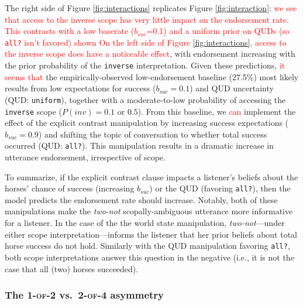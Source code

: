 \documentclass[preprint,authoryear]{elsarticle}\frenchspacing
\newcommand{\lp}[1]{\textcolor{red}{#1}} %
\begin{document}
The right side of Figure 
\ref{fig:interactions} replicates Figure \ref{fig:interaction}: 
\lp{we see that access to the inverse scope has very little impact on the endorsement rate.}
\lp{This contrasts with a low baserate ($b_{suc}$=0.1) and a uniform prior on QUDs (so \texttt{all?} isn't favored) shown 
On the left side of Figure \ref{fig:interactions}, %
access to the inverse scope does have a noticeable effect}, with endorsement increasing with the prior probability of the \texttt{inverse} interpretation. 
Given these predictions, \lp{it seems that} the empirically-observed low-endorsement baseline (27.5\%) most likely results from low expectations for success ($b_{suc}=0.1$) and QUD uncertainty (QUD: \texttt{uniform}), together with a moderate-to-low probability of accessing the \texttt{inverse} scope ($P(inv)=0.1$ or $0.5$). From this baseline, we \lp{can} implement the effect of the explicit contrast manipulation by increasing success expectations ($b_{suc}=0.9$) and shifting the topic of conversation to whether total success occurred (QUD: \texttt{all?}). This manipulation results in a dramatic increase in utterance endorsement, irrespective of scope. 

To summarize, if the explicit contrast clause impacts a listener's beliefs about the horses' chance of success (increasing $b_{suc}$) or the QUD (favoring \texttt{all?}), then the model predicts the endorsement rate should increase. Notably, both of these manipulations make the \emph{two-not} scopally-ambiguous utterance more informative for a listener. In the case of the the world state manipulation, \emph{two-not}---under either scope interpretation---informs the listener that her prior beliefs about total horse success do not hold. Similarly with the QUD manipulation favoring \texttt{all?}, both scope interpretations answer this question in the negative (i.e., it is not the case that all (two) horses succeeded). 


\subsubsection{The \textsc{1-of-2} vs.~\textsc{2-of-4} asymmetry}
\end{document}
